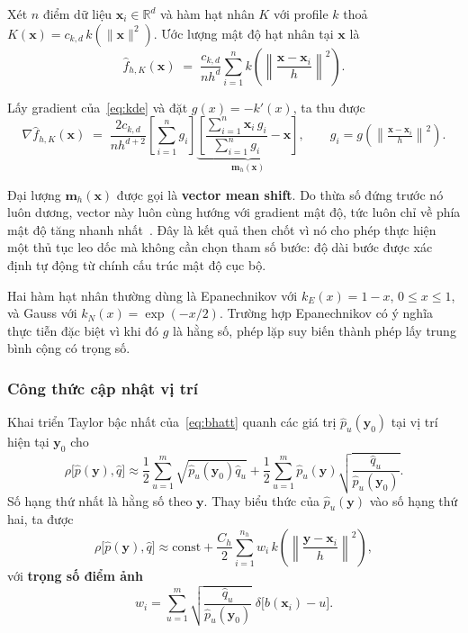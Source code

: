 \documentclass[12pt,a4paper]{article}
\numberwithin{equation}{section}
\begin{document}
Xét $n$ điểm dữ liệu $\mathbf{x}_i \in \mathbb{R}^d$ và hàm hạt nhân $K$ với profile $k$ thoả
$K(\mathbf{x}) = c_{k,d}\, k(\|\mathbf{x}\|^2)$. Ước lượng mật độ hạt nhân tại $\mathbf{x}$ là
\begin{equation}
\hat{f}_{h,K}(\mathbf{x}) \;=\; \frac{c_{k,d}}{n h^{d}} \sum_{i=1}^{n}
k\!\left( \left\| \frac{\mathbf{x}-\mathbf{x}_i}{h} \right\|^{2} \right).
\label{eq:kde}
\end{equation}

Lấy gradient của~\eqref{eq:kde} và đặt $g(x) = -k'(x)$, ta thu được
\begin{equation}
\nabla \hat{f}_{h,K}(\mathbf{x}) \;=\;
\frac{2 c_{k,d}}{n h^{d+2}}
\left[\sum_{i=1}^{n} g_i \right]
\underbrace{\left[ \frac{\sum_{i=1}^{n}\mathbf{x}_i\, g_i}{\sum_{i=1}^{n} g_i} - \mathbf{x} \right]}_{\textstyle \mathbf{m}_h(\mathbf{x})},
\qquad g_i = g\!\left(\left\|\tfrac{\mathbf{x}-\mathbf{x}_i}{h}\right\|^2\right).
\end{equation}

Đại lượng $\mathbf{m}_h(\mathbf{x})$ được gọi là \textbf{vector mean shift}. Do thừa số đứng trước
nó luôn dương, vector này luôn cùng hướng với gradient mật độ, tức luôn chỉ về phía mật độ tăng
nhanh nhất~\cite{comaniciu2002}. Đây là kết quả then chốt vì nó cho phép thực hiện một thủ tục leo
dốc mà không cần chọn tham số bước: độ dài bước được xác định tự động từ chính cấu trúc mật độ cục
bộ.

Hai hàm hạt nhân thường dùng là Epanechnikov với $k_E(x) = 1-x$, $0 \le x \le 1$, và Gauss với
$k_N(x) = \exp(-x/2)$. Trường hợp Epanechnikov có ý nghĩa thực tiễn đặc biệt vì khi đó $g$ là hằng
số, phép lặp suy biến thành phép lấy trung bình cộng có trọng số.

\subsubsection{Công thức cập nhật vị trí}

Khai triển Taylor bậc nhất của~\eqref{eq:bhatt} quanh các giá trị $\hat{p}_u(\mathbf{y}_0)$ tại vị
trí hiện tại $\mathbf{y}_0$ cho
\begin{equation}
\rho\big[\hat{p}(\mathbf{y}), \hat{q}\big] \approx
\frac{1}{2}\sum_{u=1}^{m} \sqrt{\hat{p}_u(\mathbf{y}_0)\hat{q}_u}
+ \frac{1}{2}\sum_{u=1}^{m} \hat{p}_u(\mathbf{y}) \sqrt{\frac{\hat{q}_u}{\hat{p}_u(\mathbf{y}_0)}} .
\end{equation}
Số hạng thứ nhất là hằng số theo $\mathbf{y}$. Thay biểu thức của $\hat p_u(\mathbf{y})$ vào số
hạng thứ hai, ta được
\begin{equation}
\rho\big[\hat{p}(\mathbf{y}), \hat{q}\big] \approx \text{const} +
\frac{C_h}{2} \sum_{i=1}^{n_h} w_i\,
k\!\left( \left\|\frac{\mathbf{y}-\mathbf{x}_i}{h}\right\|^{2}\right),
\end{equation}
với \textbf{trọng số điểm ảnh}
\begin{equation}
w_i = \sum_{u=1}^{m} \sqrt{\frac{\hat{q}_u}{\hat{p}_u(\mathbf{y}_0)}}\;
\delta\big[b(\mathbf{x}_i) - u\big].
\label{eq:weights}
\end{equation}
\end{document}
